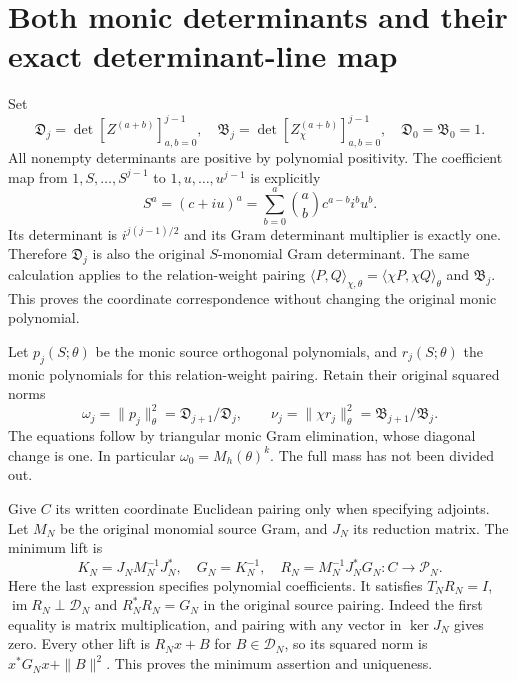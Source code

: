 \documentclass[11pt]{article}
\newcommand{\im}{\operatorname{im}}
\begin{document}
\section{Both monic determinants and their exact determinant-line map}

Set
\[
 \mathfrak D_j=\det[Z^{(a+b)}]_{a,b=0}^{j-1},\quad
 \mathfrak B_j=\det[Z_\chi^{(a+b)}]_{a,b=0}^{j-1},\quad
 \mathfrak D_0=\mathfrak B_0=1.
 \tag{TVB.11}
\]
All nonempty determinants are positive by polynomial positivity.
The coefficient map from $1,S,\ldots,S^{j-1}$ to
$1,u,\ldots,u^{j-1}$ is explicitly
\[
 S^a=(c+iu)^a=\sum_{b=0}^a\binom ab c^{a-b}i^b u^b.
 \tag{TVB.12}
\]
Its determinant is $i^{j(j-1)/2}$ and its Gram determinant
multiplier is exactly one. Therefore $\mathfrak D_j$ is also
the original $S$-monomial Gram determinant. The same calculation
applies to the relation-weight pairing
$\langle P,Q\rangle_{\chi,\theta}=\langle\chi P,\chi Q\rangle_\theta$
and $\mathfrak B_j$. This proves the coordinate correspondence
without changing the original monic polynomial.

Let $p_j(S;\theta)$ be the monic source orthogonal polynomials,
and $r_j(S;\theta)$ the monic polynomials for this relation-weight
pairing. Retain their original squared norms
\[
 \omega_j=\|p_j\|_\theta^2=\mathfrak D_{j+1}/\mathfrak D_j,
 \qquad\nu_j=\|\chi r_j\|_\theta^2
               =\mathfrak B_{j+1}/\mathfrak B_j.
 \tag{TVB.13}
\]
The equations follow by triangular monic Gram elimination, whose
diagonal change is one. In particular $\omega_0=M_h(\theta)^k$.
The full mass has not been divided out.

Give $C$ its written coordinate Euclidean pairing only when
specifying adjoints. Let $M_N$ be the original monomial source
Gram, and $J_N$ its reduction matrix. The minimum lift is
\[
 K_N=J_NM_N^{-1}J_N^*,\quad G_N=K_N^{-1},\quad
 R_N=M_N^{-1}J_N^*G_N:C\longrightarrow\mathcal P_N.
 \tag{TVB.14}
\]
Here the last expression specifies polynomial coefficients.
It satisfies $T_NR_N=I$, $\im R_N\perp\mathcal D_N$ and
$R_N^*R_N=G_N$ in the original source pairing. Indeed the first
equality is matrix multiplication, and pairing with any vector
in $\ker J_N$ gives zero. Every other lift is $R_Nx+B$ for
$B\in\mathcal D_N$, so its squared norm is
$x^*G_Nx+\|B\|^2$. This proves the minimum assertion and
uniqueness.
\end{document}
